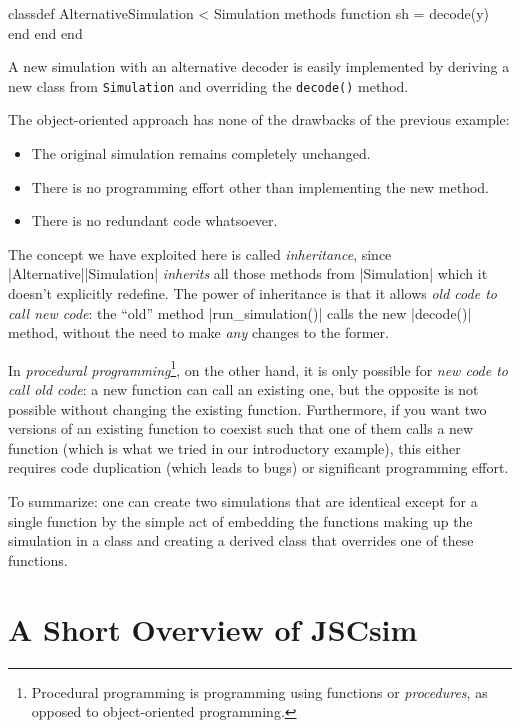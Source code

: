 \begin{listing}
\begin{Code}
  classdef AlternativeSimulation < Simulation
    methods
      function sh = decode(y)
      end
    end 
  end
\end{Code}
  \caption{A new simulation with an alternative decoder is easily implemented by
  deriving a new class from \texttt{Simulation} and overriding the
  \texttt{decode()} method.}
  \label{lst:derivedclass}
\end{listing}

The object-oriented approach has none of the drawbacks of the previous example:
\begin{itemize}
  \item The original simulation remains completely unchanged.
  \item There is no programming effort other than implementing the new method.
  \item There is no redundant code whatsoever.
\end{itemize}

The concept we have exploited here is called \emph{inheritance}, since
|Alternative|\-|Simulation| \emph{inherits} all those methods from
|Simulation| which it doesn't explicitly redefine.  The power of
inheritance is that it allows \emph{old code to call new code}: the
``old'' method |run_simulation()| calls the new |decode()| method, without
the need to make \emph{any} changes to the former. 

In \emph{procedural programming}\footnote{Procedural programming is programming
using functions or \emph{procedures}, as opposed to object-oriented
programming.}, on the other hand, it is only possible for \emph{new code to call old code}: a new
function can call an existing one, but the opposite is not possible without
changing the existing function.  Furthermore, if you want two versions of an
existing function to coexist such that one of them calls a new function (which
is what we tried in our introductory example), this either requires code
duplication (which leads to bugs) or significant programming effort. 

To summarize: one can create two simulations that are identical except for a
single function by the simple act of embedding the functions making up the
simulation in a class and creating a derived class that overrides one of these
functions.


\section{A Short Overview of JSCsim}\label{sec:overview}

